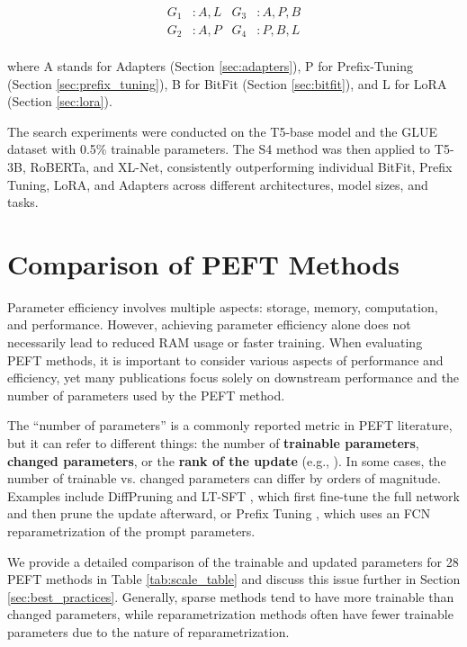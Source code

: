 \begin{equation}
\begin{aligned}
G_1 &: A, L & G_3 &: A, P, B \\
G_2 &: A, P & G_4 &: P, B, L \\
\end{aligned}
\end{equation}

where A stands for Adapters (Section \ref{sec:adapters}), P for Prefix-Tuning (Section \ref{sec:prefix_tuning}), B for BitFit (Section \ref{sec:bitfit}), and L for LoRA (Section \ref{sec:lora}).

The search experiments were conducted on the T5-base model and the GLUE dataset with 0.5\% trainable parameters. The S4 method was then applied to T5-3B, RoBERTa, and XL-Net, consistently outperforming individual BitFit, Prefix Tuning, LoRA, and Adapters across different architectures, model sizes, and tasks.

\section{Comparison of PEFT Methods}
\label{sec:peft_comparison_theory}

Parameter efficiency involves multiple aspects: storage, memory, computation, and performance. However, achieving parameter efficiency alone does not necessarily lead to reduced RAM usage or faster training. When evaluating PEFT methods, it is important to consider various aspects of performance and efficiency, yet many publications focus solely on downstream performance and the number of parameters used by the PEFT method.

The ``number of parameters'' is a commonly reported metric in PEFT literature, but it can refer to different things: the number of \textbf{trainable parameters}, \textbf{changed parameters}, or the \textbf{rank of the update} (e.g., \citet{intrinsic_said}). In some cases, the number of trainable vs. changed parameters can differ by orders of magnitude. Examples include DiffPruning and LT-SFT \citep{diff_pruning,lottery_ticket_tuning}, which first fine-tune the full network and then prune the update afterward, or Prefix Tuning \citep{prefix_tuning}, which uses an FCN reparametrization of the prompt parameters.

We provide a detailed comparison of the trainable and updated parameters for 28 PEFT methods in Table \ref{tab:scale_table} and discuss this issue further in Section \ref{sec:best_practices}. Generally, sparse methods tend to have more trainable than changed parameters, while reparametrization methods often have fewer trainable parameters due to the nature of reparametrization.

